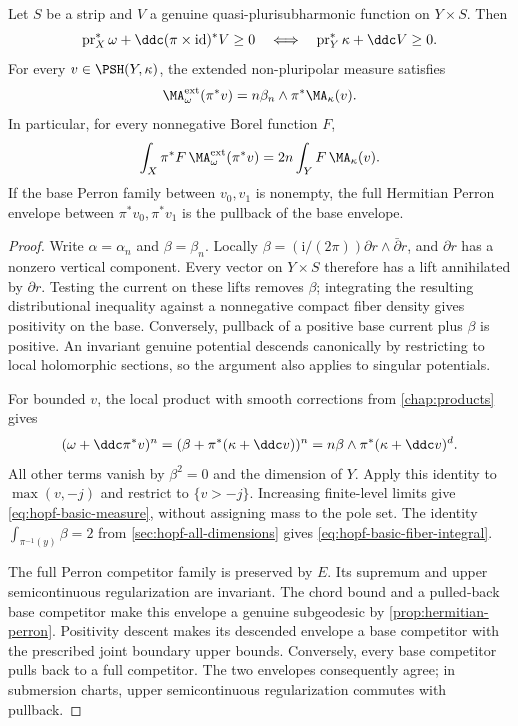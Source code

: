 \begin{proposition}\label{prop:hopf-basic-descent}
Let $S$ be a strip and $V$ a genuine quasi-plurisubharmonic function on $Y\times S$. Then
\[
 \operatorname{pr}_X^*\omega+\ddc(\pi\times\mathrm{id})^*V\geq0
 \quad\Longleftrightarrow\quad
 \operatorname{pr}_Y^*\kappa+\ddc V\geq0.
\]
For every $v\in\PSH(Y,\kappa)$, the extended non-pluripolar measure satisfies
\begin{equation}\label{eq:hopf-basic-measure}
 \MA^{\mathrm{ext}}_\omega(\pi^*v)
   =n\beta_n\wedge\pi^*\MA_\kappa(v).
\end{equation}
In particular, for every nonnegative Borel function $F$,
\begin{equation}\label{eq:hopf-basic-fiber-integral}
 \int_X\pi^*F\,\MA^{\mathrm{ext}}_\omega(\pi^*v)
 =2n\int_YF\,\MA_\kappa(v).
\end{equation}
If the base Perron family between $v_0,v_1$ is nonempty, the full Hermitian Perron envelope between $\pi^*v_0,\pi^*v_1$ is the pullback of the base envelope.
\end{proposition}
\begin{proof}
Write $\alpha=\alpha_n$ and $\beta=\beta_n$. Locally
$\beta=(\mathrm i/(2\pi))\partial r\wedge\bar\partial r$, and $\partial r$ has a nonzero vertical component. Every vector on $Y\times S$ therefore has a lift annihilated by $\partial r$. Testing the current on these lifts removes $\beta$; integrating the resulting distributional inequality against a nonnegative compact fiber density gives positivity on the base. Conversely, pullback of a positive base current plus $\beta$ is positive. An invariant genuine potential descends canonically by restricting to local holomorphic sections, so the argument also applies to singular potentials.

For bounded $v$, the local product with smooth corrections from \cref{chap:products} gives
\[
 (\omega+\ddc\pi^*v)^n
  =(\beta+\pi^*(\kappa+\ddc v))^n
  =n\beta\wedge\pi^*(\kappa+\ddc v)^d.
\]
All other terms vanish by $\beta^2=0$ and the dimension of $Y$. Apply this identity to $\max(v,-j)$ and restrict to $\{v>-j\}$. Increasing finite-level limits give \eqref{eq:hopf-basic-measure}, without assigning mass to the pole set. The identity $\int_{\pi^{-1}(y)}\beta=2$ from \cref{sec:hopf-all-dimensions} gives \eqref{eq:hopf-basic-fiber-integral}.

The full Perron competitor family is preserved by $E$. Its supremum and upper semicontinuous regularization are invariant. The chord bound and a pulled-back base competitor make this envelope a genuine subgeodesic by \cref{prop:hermitian-perron}. Positivity descent makes its descended envelope a base competitor with the prescribed joint boundary upper bounds. Conversely, every base competitor pulls back to a full competitor. The two envelopes consequently agree; in submersion charts, upper semicontinuous regularization commutes with pullback.
\end{proof}

